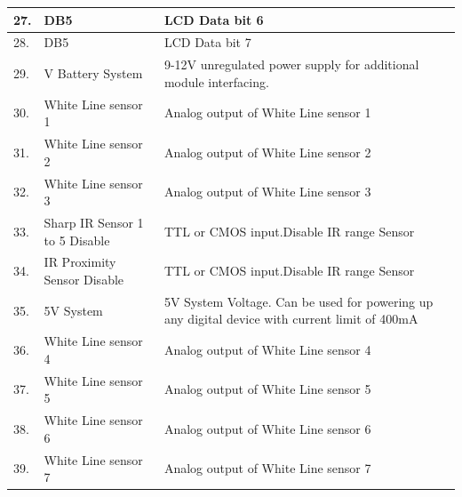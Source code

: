 \documentclass[a4paper,12pt,oneside]{book}
\begin{document}
\begin{tabular}{|p{2cm}|p{4cm}|p{10cm}|}
\hline
27. & DB5 & LCD Data bit 6\\
\hline
28. & DB5 & LCD Data bit 7\\
\hline
29. & V Battery System & 9-12V unregulated power supply for additional module interfacing.\\
\hline
30. & White Line sensor 1 & Analog output of White Line sensor 1\\
\hline
31. & White Line sensor 2 & Analog output of White Line sensor 2\\
\hline
32. & White Line sensor 3 & Analog output of White Line sensor 3\\
\hline
33. & Sharp IR Sensor 1 to 5 Disable &TTL or CMOS input.Disable IR range Sensor\\
\hline
34. &IR Proximity Sensor Disable &TTL or CMOS input.Disable IR range Sensor\\
	\hline
35. &5V System &5V System Voltage. Can be used for powering up any digital device with current limit of 400mA  \\ 
\hline
36. & White Line sensor 4 & Analog output of White Line sensor 4\\
\hline
37. & White Line sensor 5 & Analog output of White Line sensor 5\\
\hline
38. & White Line sensor 6 & Analog output of White Line sensor 6\\
\hline
39. & White Line sensor 7 & Analog output of White Line sensor 7\\
\hline
\end{tabular}
\pagebreak 
\end{document}

